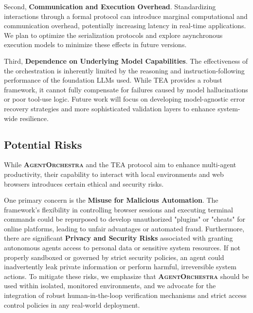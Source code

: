 \documentclass[11pt]{article}
\newcommand{\projectname}{\textbf{\textsc{AgentOrchestra}}\xspace}
\begin{document}
Second, \textbf{Communication and Execution Overhead}. Standardizing interactions through a formal protocol can introduce marginal computational and communication overhead, potentially increasing latency in real-time applications. We plan to optimize the serialization protocols and explore asynchronous execution models to minimize these effects in future versions.

Third, \textbf{Dependence on Underlying Model Capabilities}. The effectiveness of the orchestration is inherently limited by the reasoning and instruction-following performance of the foundation LLMs used. While TEA provides a robust framework, it cannot fully compensate for failures caused by model hallucinations or poor tool-use logic. Future work will focus on developing model-agnostic error recovery strategies and more sophisticated validation layers to enhance system-wide resilience.

\subsection{Potential Risks}

While \projectname and the TEA protocol aim to enhance multi-agent productivity, their capability to interact with local environments and web browsers introduces certain ethical and security risks. 

One primary concern is the \textbf{Misuse for Malicious Automation}. The framework's flexibility in controlling browser sessions and executing terminal commands could be repurposed to develop unauthorized "plugins" or "cheats" for online platforms, leading to unfair advantages or automated fraud. Furthermore, there are significant \textbf{Privacy and Security Risks} associated with granting autonomous agents access to personal data or sensitive system resources. If not properly sandboxed or governed by strict security policies, an agent could inadvertently leak private information or perform harmful, irreversible system actions. To mitigate these risks, we emphasize that \projectname should be used within isolated, monitored environments, and we advocate for the integration of robust human-in-the-loop verification mechanisms and strict access control policies in any real-world deployment.



%

\end{document}

